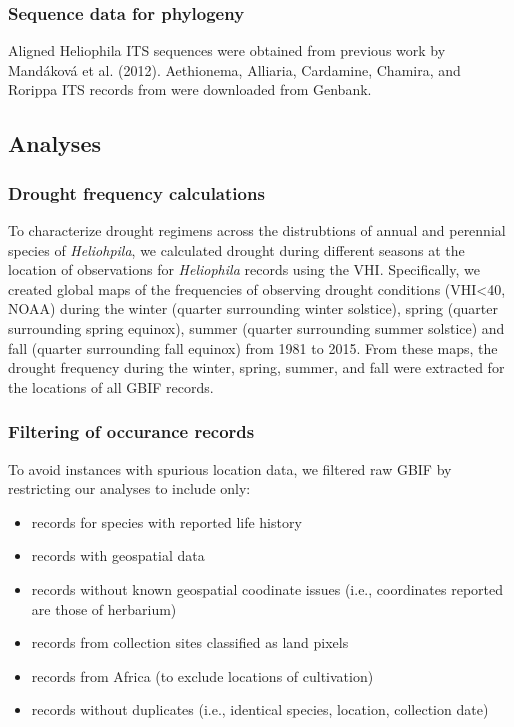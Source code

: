 \documentclass[man,floatsintext]{apa6}
\providecommand{\tightlist}{%
  \setlength{\itemsep}{0pt}\setlength{\parskip}{0pt}}
\theoremstyle{definition}
\theoremstyle{definition}
\theoremstyle{definition}
\theoremstyle{remark}
\begin{document}
\hypertarget{sequence-data-for-phylogeny}{%
\subsubsection{Sequence data for
phylogeny}\label{sequence-data-for-phylogeny}}

Aligned Heliophila ITS sequences were obtained from previous work by
Mandáková et al. (2012). Aethionema, Alliaria, Cardamine, Chamira, and
Rorippa ITS records from were downloaded from Genbank.

\hypertarget{analyses}{%
\subsection{Analyses}\label{analyses}}

\hypertarget{drought-frequency-calculations}{%
\subsubsection{Drought frequency
calculations}\label{drought-frequency-calculations}}

To characterize drought regimens across the distrubtions of annual and
perennial species of \emph{Heliohpila}, we calculated drought during
different seasons at the location of observations for \emph{Heliophila}
records using the VHI. Specifically, we created global maps of the
frequencies of observing drought conditions (VHI\textless{}40, NOAA)
during the winter (quarter surrounding winter solstice), spring (quarter
surrounding spring equinox), summer (quarter surrounding summer
solstice) and fall (quarter surrounding fall equinox) from 1981 to 2015.
From these maps, the drought frequency during the winter, spring,
summer, and fall were extracted for the locations of all GBIF records.

\hypertarget{filtering-of-occurance-records}{%
\subsubsection{Filtering of occurance
records}\label{filtering-of-occurance-records}}

To avoid instances with spurious location data, we filtered raw GBIF by
restricting our analyses to include only:

\begin{itemize}
\tightlist
\item
  records for species with reported life history\\
\item
  records with geospatial data\\
\item
  records without known geospatial coodinate issues (i.e., coordinates
  reported are those of herbarium)\\
\item
  records from collection sites classified as land pixels\\
\item
  records from Africa (to exclude locations of cultivation)
\item
  records without duplicates (i.e., identical species, location,
  collection date)
\end{itemize}
\end{document}
